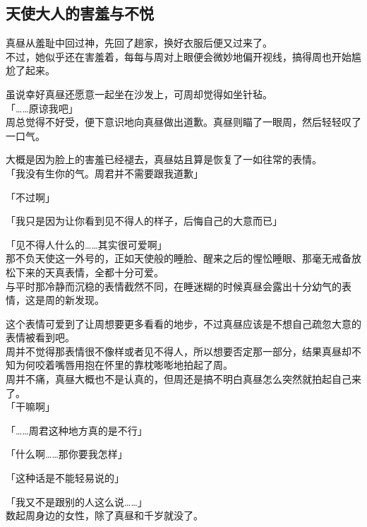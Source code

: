 \subsection{天使大人的害羞与不悦}

真昼从羞耻中回过神，先回了趟家，换好衣服后便又过来了。\\

不过，她似乎还在害羞着，每每与周对上眼便会微妙地偏开视线，搞得周也开始尴尬了起来。

虽说幸好真昼还愿意一起坐在沙发上，可周却觉得如坐针毡。\\

「……原谅我吧」\\

周总觉得不好受，便下意识地向真昼做出道歉。真昼则瞄了一眼周，然后轻轻叹了一口气。

大概是因为脸上的害羞已经褪去，真昼姑且算是恢复了一如往常的表情。\\

「我没有生你的气。周君并不需要跟我道歉」

「不过啊」

「我只是因为让你看到见不得人的样子，后悔自己的大意而已」

「见不得人什么的……其实很可爱啊」\\

那不负天使这一外号的，正如天使般的睡脸、醒来之后的惺忪睡眼、那毫无戒备放松下来的天真表情，全都十分可爱。\\

与平时那冷静而沉稳的表情截然不同，在睡迷糊的时候真昼会露出十分幼气的表情，这是周的新发现。

这个表情可爱到了让周想要更多看看的地步，不过真昼应该是不想自己疏忽大意的表情被看到吧。\\

周并不觉得那表情很不像样或者见不得人，所以想要否定那一部分，结果真昼却不知为何咬着嘴唇用抱在怀里的靠枕嘭嘭地拍起了周。\\

周并不痛，真昼大概也不是认真的，但周还是搞不明白真昼怎么突然就拍起自己来了。\\

「干嘛啊」

「……周君这种地方真的是不行」

「什么啊……那你要我怎样」

「这种话是不能轻易说的」

「我又不是跟别的人这么说……」\\

数起周身边的女性，除了真昼和千岁就没了。

